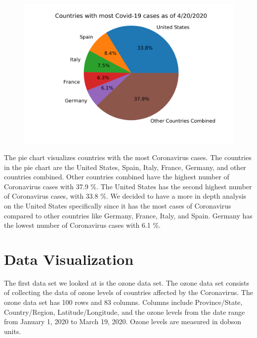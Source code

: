 \documentclass[10pt,journal,compsoc]{IEEEtran}
\begin{document}
{{\begin{figure}[!htbp] %
	\includegraphics[scale=0.54]{covid-us.png}\\ 
	\centering
	\label{LP-COVID-World}
\end{figure}

	The pie chart visualizes countries with the most Coronavirus cases. The countries in the pie chart are the United States, Spain, Italy, France, Germany, and other countries combined. Other countries combined have the highest number of Coronavirus cases with 37.9 \%. The United States has the second highest number of Coronavirus cases, with 33.8 \%. We decided to have a more in depth analysis on the United States specifically since it has the most cases of Coronavirus compared to other countries like Germany, France, Italy, and Spain. Germany has the lowest number of Coronavirus cases with 6.1 \%.


\section{Data Visualization}\label{sec:data visualization}

	The first data set we looked at is the ozone data set. \cite{eeemonts-2020} The ozone data set consists of collecting the data of ozone levels of countries affected by the Coronavirus. The ozone data set has 100 rows and 83 columns. Columns include Province/State, Country/Region, Latitude/Longitude, and the ozone levels from the date range from January 1, 2020 to March 19, 2020. Ozone levels are measured in dobson units.

}}
\end{document}
